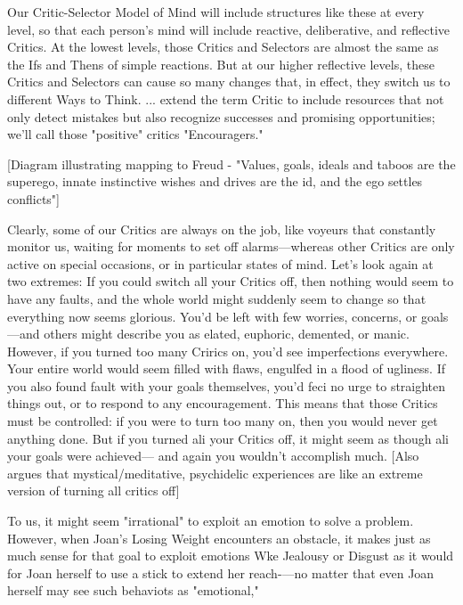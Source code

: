 \documentclass[10pt,a4paper]{article}
\begin{document}
Our Critic-Selector Model of Mind will include structures like these at every level, so that each person's mind will include reactive, deliberative, and reflective Critics. At the lowest levels, those Critics and Selectors are almost the same as the Ifs and Thens of simple reactions. But at our higher reflective levels, these Critics and Selectors can cause so many changes that, in effect, they switch us to different Ways to Think.
...
extend the term Critic to include resources that not only detect mistakes but also recognize successes and promising opportunities; we'll call those "positive" critics "Encouragers." \cite[p.~86]{minsky}

[Diagram illustrating mapping to Freud - "Values, goals, ideals and taboos are the superego, innate instinctive wishes and drives are the id, and the ego settles conflicts"]\cite[p.~88]{minsky}

Clearly, some of our Critics are always on the job, like voyeurs that constantly monitor us, waiting for moments to set off alarms—whereas other Critics are only active on special occasions, or in particular states of mind. Let's look again at two extremes:
If you could switch all your Critics off, then nothing would seem to have any faults, and the whole world might suddenly seem to change so that everything now seems glorious. You'd be left with few worries, concerns, or goals—and others might describe you as elated, euphoric, demented, or manic.
However, if you turned too many Crirics on, you'd see imperfections everywhere. Your entire world would seem filled with flaws, engulfed in a flood of ugliness. If you also found fault with your goals themselves, you'd feci no urge to straighten things out, or to respond to any encouragement.
This means that those Critics must be controlled: if you were to turn too many on, then you would never get anything done. But if you turned ali your Critics off, it might seem as though ali your goals were achieved— and again you wouldn't accomplish much.
[Also argues that mystical/meditative, psychidelic experiences are like an extreme version of turning all critics off] \cite[p.~89-90]{minsky}

To us, it might seem "irrational" to exploit an emotion to solve a problem. However, when Joan's Losing Weight encounters an obstacle, it makes just as much sense for that goal to exploit emotions Wke Jealousy or Disgust as it would for Joan herself to use a stick to extend her reach-—no matter that even Joan herself may see such behaviots as "emotional," \cite[p.~92]{minsky}
\end{document}
